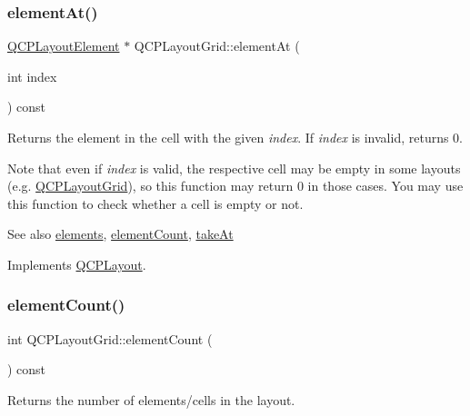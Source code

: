 \subsubsection{\texorpdfstring{element\+At()}{elementAt()}}
{\footnotesize\ttfamily \hyperlink{class_q_c_p_layout_element}{Q\+C\+P\+Layout\+Element} $\ast$ Q\+C\+P\+Layout\+Grid\+::element\+At (\begin{DoxyParamCaption}\item[{int}]{index }\end{DoxyParamCaption}) const\hspace{0.3cm}{\ttfamily [virtual]}}

Returns the element in the cell with the given {\itshape index}. If {\itshape index} is invalid, returns 0.

Note that even if {\itshape index} is valid, the respective cell may be empty in some layouts (e.\+g. \hyperlink{class_q_c_p_layout_grid}{Q\+C\+P\+Layout\+Grid}), so this function may return 0 in those cases. You may use this function to check whether a cell is empty or not.

\begin{DoxySeeAlso}{See also}
\hyperlink{class_q_c_p_layout_grid_a20a745d013de4c89cf5de8004a5a36f7}{elements}, \hyperlink{class_q_c_p_layout_grid_a77f194843d037e0da6d5f3170acdf3a2}{element\+Count}, \hyperlink{class_q_c_p_layout_grid_acc1277394ff8a6432e111ff9463e6375}{take\+At} 
\end{DoxySeeAlso}


Implements \hyperlink{class_q_c_p_layout_afa73ca7d859f8a3ee5c73c9b353d2a56}{Q\+C\+P\+Layout}.

\hypertarget{class_q_c_p_layout_grid_a77f194843d037e0da6d5f3170acdf3a2}{}\label{class_q_c_p_layout_grid_a77f194843d037e0da6d5f3170acdf3a2} 
\subsubsection{\texorpdfstring{element\+Count()}{elementCount()}}
{\footnotesize\ttfamily int Q\+C\+P\+Layout\+Grid\+::element\+Count (\begin{DoxyParamCaption}{ }\end{DoxyParamCaption}) const\hspace{0.3cm}{\ttfamily [virtual]}}

Returns the number of elements/cells in the layout.

